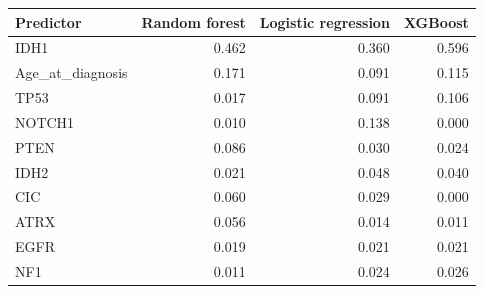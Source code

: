 \begin{tabular}{lrrr}
\toprule
\textbf{Predictor} & \textbf{Random forest} & \textbf{Logistic regression} & \textbf{XGBoost} \\
\midrule
IDH1 & 0.462 & 0.360 & 0.596 \\
Age\_at\_diagnosis & 0.171 & 0.091 & 0.115 \\
TP53 & 0.017 & 0.091 & 0.106 \\
NOTCH1 & 0.010 & 0.138 & 0.000 \\
PTEN & 0.086 & 0.030 & 0.024 \\
IDH2 & 0.021 & 0.048 & 0.040 \\
CIC & 0.060 & 0.029 & 0.000 \\
ATRX & 0.056 & 0.014 & 0.011 \\
EGFR & 0.019 & 0.021 & 0.021 \\
NF1 & 0.011 & 0.024 & 0.026 \\
\bottomrule
\end{tabular}
